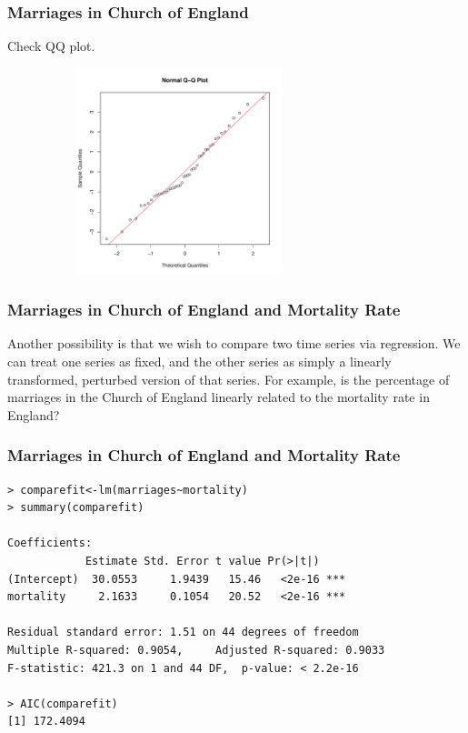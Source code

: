 \documentclass[%
xcolor=pdftex]{beamer}
\begin{document}
\begin{frame}
\frametitle{Marriages in Church of England}

Check QQ plot.

\includegraphics[width=100mm, height=60mm]{pics/qqnormtimefitsq.pdf}

\end{frame}

\begin{frame}
\frametitle{Marriages in Church of England and Mortality Rate}

Another possibility is that we wish to compare two time series via regression.  We can treat one series as fixed, and the other series as simply a linearly transformed, perturbed version of that series. For example, is the percentage of marriages in the Church of England linearly related to the mortality rate in England?

\end{frame}

\begin{frame}[fragile]
\frametitle{Marriages in Church of England and Mortality Rate}

\begin{verbatim}
> comparefit<-lm(marriages~mortality)
> summary(comparefit)

Coefficients:
            Estimate Std. Error t value Pr(>|t|)
(Intercept)  30.0553     1.9439   15.46   <2e-16 ***
mortality     2.1633     0.1054   20.52   <2e-16 ***

Residual standard error: 1.51 on 44 degrees of freedom
Multiple R-squared: 0.9054,     Adjusted R-squared: 0.9033
F-statistic: 421.3 on 1 and 44 DF,  p-value: < 2.2e-16

> AIC(comparefit)
[1] 172.4094
\end{verbatim}

\end{frame}
\end{document}
